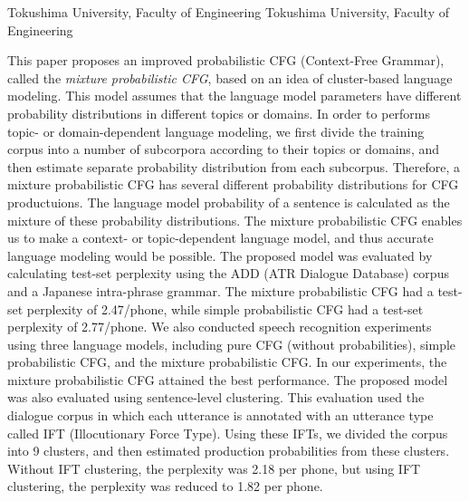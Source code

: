 
\setcounter{page}{103}
\setcounter{巻数}{3}
\setcounter{号数}{4}
\setcounter{年}{1996}
\setcounter{月}{10}

\setcounter{secnumdepth}{2}

\title{}
\author{}
\jkeywords{}




          {Tokushima University, Faculty of Engineering}
          {Tokushima University, Faculty of Engineering}

\eabstract
{
This paper proposes an improved probabilistic CFG (Context-Free Grammar),
called the {\em mixture probabilistic CFG},
based on an idea of cluster-based language modeling.
This model assumes that
the language model parameters have different probability distributions
in different topics or domains.
In order to performs topic- or domain-dependent language modeling,
we first divide the training corpus into a number of subcorpora
according to their topics or domains,
and then estimate separate probability distribution
from each subcorpus.
Therefore, a mixture probabilistic CFG
has several different probability distributions
for CFG productuions.
The language model probability of a sentence is calculated
as the mixture of these probability distributions.
The mixture probabilistic CFG enables us to make a context- or topic-dependent
language model,
and thus accurate language modeling would be possible.
The proposed model was evaluated by calculating test-set perplexity
using the ADD (ATR Dialogue Database) corpus and a Japanese intra-phrase
grammar.
The mixture probabilistic CFG had a test-set perplexity of 2.47/phone,
while simple probabilistic CFG had a test-set perplexity of 2.77/phone.
We also conducted speech recognition experiments
using three language models,
including pure CFG (without probabilities),
simple probabilistic CFG, and the mixture probabilistic CFG.
In our experiments, the mixture probabilistic CFG
attained the best performance.
The proposed model was also evaluated using sentence-level clustering.
This evaluation used the dialogue corpus in which each utterance is annotated with
an utterance type called IFT (Illocutionary Force Type).
Using these IFTs, we divided the corpus into 9 clusters,
and then estimated production probabilities from these clusters.
Without IFT clustering, the perplexity was 2.18 per phone,
but using IFT clustering, the perplexity was reduced to 1.82 per phone.
}

